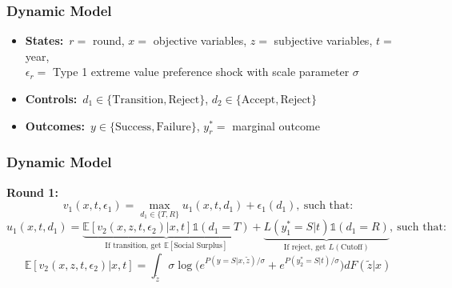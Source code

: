 \documentclass[12pt, aspectratio=169]{beamer}
\begin{document}
\begin{frame}[label=ydm1]
\frametitle{Dynamic Model}
\begin{itemize}
\item \textbf{States:}\ $r=$ round, $x=$ objective variables, $z=$ subjective variables, $t=$ year, \\ $\epsilon_r=$ Type 1 extreme value preference shock with scale parameter $\sigma$
\vspace{5pt}
\item \textbf{Controls:}\ $d_1\in{\{\text{Transition},\text{Reject}\}}$, $d_2\in{\{\text{Accept},\text{Reject}\}}$
\vspace{5pt}
\item \textbf{Outcomes:}\ $y\in{\{\text{Success},\text{Failure}\}}$, $y_r^*=$ marginal outcome
\vspace{10pt}
\end{itemize}
\hyperlink{ydp}{}
\end{frame}

\addtocounter{framenumber}{-1}
\begin{frame}[label=ydm2]
\frametitle{Dynamic Model}
\textbf{Round 1:}
\begin{equation*}
v_1(x,t,\epsilon_1) = \max_{d_1\in\{T,R\}}u_1(x,t,d_1)+\epsilon_1(d_1), \: \text{such that:}
\end{equation*}
\begin{equation*}
u_1(x,t,d_1) = \underbrace{\mathbb{E}[v_2(x,z,t,\epsilon_2)|x,t]\mathds{1}(d_1=T)}_{\text{If transition, get $\mathbb E[\text{Social Surplus}]$}}+\underbrace{L(y_1^*=S|t)\mathds{1}(d_1=R)}_{\text{If reject, get $L(\text{Cutoff})$}}, \: \text{such that:}
\end{equation*}
\begin{equation*}
\mathbb{E}[v_2(x,z,t,\epsilon_2)|x,t] = \int_{\widetilde z}\sigma\log\Big(e^{P(y=S|x,\widetilde z)/\sigma}+e^{P(y_2^*=S|t)/\sigma}\Big)dF(\widetilde z|x)
\end{equation*}
\hyperlink{ydp}{}
\end{frame}
\end{document}
